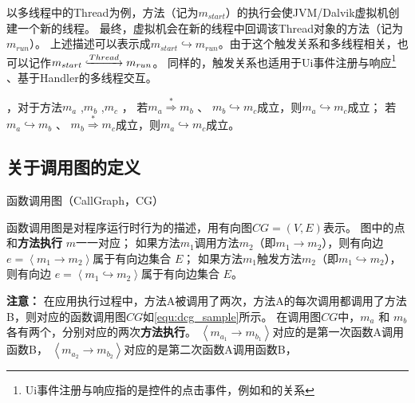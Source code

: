 以多线程中的Thread为例，方法（记为$m_{start}$）的执行会使JVM/Dalvik虚拟机创建一个新的线程。
最终，虚拟机会在新的线程中回调该Thread对象的方法（记为$m_{run}$）。
上述描述可以表示成$m_{start} \hookrightarrow m_{run}$。由于这个触发关系和多线程相关，也可以记作$m_{start} \lhook\joinrel\xrightarrow{Thread}  m_{run} $。
同样的，触发关系也适用于Ui事件注册与响应\footnote{Ui事件注册与响应指的是控件的点击事件，例如和的关系} 、基于Handler的多线程交互。

，对于方法$m_a$ ,$m_b$ ,$m_c$ ，
若$m_a  \stackrel{\ast}{ \Rightarrow } m_b$ 、 $m_b \hookrightarrow m_c$成立，则$m_a \hookrightarrow m_c$成立；
若$m_a  \hookrightarrow m_b$ 、 $m_b \stackrel{\ast}{ \Rightarrow }  m_c$成立，则$m_a \hookrightarrow m_c$成立。

\subsection{关于调用图的定义}

\begin{Def}
	函数调用图（CallGraph，CG）
\end{Def}	


	函数调用图是对程序运行时行为的描述，用有向图$CG = ( V , E)$表示。 图中的点和\textbf{方法执行} $m$一一对应；
	如果方法$m_1$调用方法$m_2$（即$m_1 \to m_2$），则有向边 $e = \left\langle m_1  \to m_2 \right\rangle $属于有向边集合 $E$；
	如果方法$m_1$触发方法$m_2$（即$m_1 \hookrightarrow m_2$），则有向边 $e = \left\langle m_1  \hookrightarrow m_2 \right\rangle $属于有向边集合 $E$。 


\textbf{注意：}
在应用执行过程中，方法A被调用了两次，方法A的每次调用都调用了方法B，则对应的函数调用图$CG$如\autoref{equ:dcg_sample}所示。
在调用图$CG$中，$m_a$ 和 $m_b$ 各有两个，分别对应的两次\textbf{方法执行}。
$\left\langle m_{a_{1}} \to m_{b_{1}}\right\rangle $对应的是第一次函数A调用函数B，
$\left\langle m_{a_{2}} \to m_{b_{2}} \right\rangle    $对应的是第二次函数A调用函数B，



